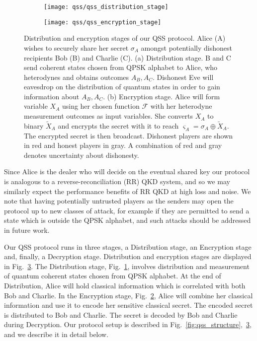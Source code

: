 \begin{figure}[htp]
\centering
	\begin{subfigure}{0.8\linewidth}
		\centering
		\caption{\label{fig:qss_distribution_stage}}
		\texttt{[image: qss/qss\_distribution\_stage]}
		
	\end{subfigure}
	\begin{subfigure}{0.8\linewidth}
		\centering
		\caption{\label{fig:qss_encryption_stage}}
		\texttt{[image: qss/qss\_encryption\_stage]}
		
	\end{subfigure}
\caption{\label{fig:qss_protocol_cartoon} Distribution and encryption stages of our QSS protocol. Alice (A) wishes to securely share her secret $\sigma_A$ amongst potentially dishonest recipients Bob (B) and Charlie (C). (a) Distribution stage. B and C send coherent states chosen from QPSK alphabet to Alice, who heterodynes and obtains outcomes $A_B, A_C$. Dishonest Eve will eavesdrop on the distribution of quantum states in order to gain information about $A_B, A_C$. (b) Encryption stage. Alice will form variable $X_A$ using her chosen function $\mathcal{F}$ with her heterodyne measurement outcomes as input variables. She converts $X_A$ to binary $\tilde{X}_A$ and encrypts the secret with it to reach $\varsigma_A = \sigma_A \oplus \tilde{X}_A$. The encrypted secret is then broadcast. Dishonest players are shown in red and honest players in gray. A combination of red and gray denotes uncertainty about dishonesty.
}
\end{figure}

Since Alice is the dealer who will decide on the eventual shared key our protocol is analogous to a reverse-reconciliation (RR) QKD system, and so we may similarly expect the performance benefits of RR QKD at high loss and noise. We note that having potentially untrusted players as the senders may open the protocol up to new classes of attack, for example if they are permitted to send a state which is outside the QPSK alphabet, and such attacks should be addressed in future work.



Our QSS protocol runs in three stages, a Distribution stage, an Encryption stage and, finally, a Decryption stage. Distribution and encryption stages are displayed in Fig.~\ref{fig:qss_protocol_cartoon}. The Distribution stage, Fig.~\ref{fig:qss_distribution_stage}, involves distribution and measurement of quantum coherent states chosen from QPSK alphabet. At the end of Distribution, Alice will hold classical information which is correlated with both Bob and Charlie. In the Encryption stage, Fig.~\ref{fig:qss_encryption_stage}, Alice will combine her classical information and use it to encode her sensitive classical secret. The encoded secret is distributed to Bob and Charlie. The secret is decoded by Bob and Charlie during Decryption. Our protocol setup is described in Fig.~\ref{fig:qss_structure},~\ref{fig:qss_protocol_cartoon}, and we describe it in detail below.

